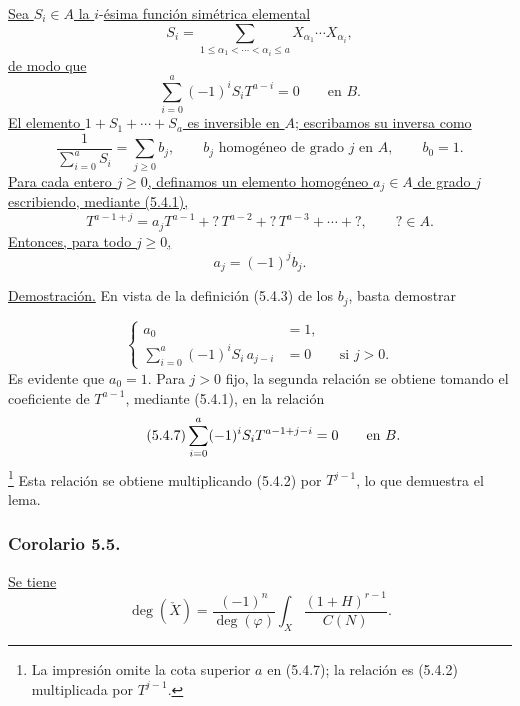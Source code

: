 \pageoriginale

\underline{Sea $S_i\in A$ la }$i$-\underline{ésima función simétrica elemental}
\[
S_i=\sum_{1\leq\alpha_1<\cdots<\alpha_i\leq a}
X_{\alpha_1}\cdots X_{\alpha_i},
\]
\underline{de modo que}
\begin{equation}\tag{5.4.2}
\sum_{i=0}^{a}(-1)^iS_iT^{a-i}=0
\qquad\text{en }B.
\end{equation}
\underline{El elemento $1+S_1+\cdots+S_a$ es inversible en $A$;
escribamos su inversa como}
\begin{equation}\tag{5.4.3}
\frac{1}{\sum_{i=0}^{a}S_i}
=\sum_{j\geq0}b_j,
\qquad b_j\text{ homogéneo de grado }j\text{ en }A,
\qquad b_0=1.
\end{equation}
\underline{Para cada entero $j\geq0$, definamos un elemento homogéneo
$a_j\in A$ de grado $j$ escribiendo, mediante (5.4.1),}
\begin{equation}\tag{5.4.4}
T^{a-1+j}
=a_jT^{a-1}+{}?\,T^{a-2}+{}?\,T^{a-3}+\cdots+{}?,
\qquad ?\in A.
\end{equation}
\underline{Entonces, para todo $j\geq0$,}
\begin{equation}\tag{5.4.5}
a_j=(-1)^jb_j.
\end{equation}

\noindent\underline{Demostración.}
En vista de la definición (5.4.3) de los $b_j$, basta demostrar

\pageoriginale

\begin{equation}\tag{5.4.6}
\left\{
\begin{aligned}
a_0&=1,\\
\sum_{i=0}^{a}(-1)^iS_i\,a_{j-i}&=0
&&\text{si }j>0.
\end{aligned}
\right.
\end{equation}
Es evidente que $a_0=1$. Para $j>0$ fijo, la segunda relación se
obtiene tomando el coeficiente de $T^{a-1}$, mediante (5.4.1), en la
relación
\begin{equation}\tag{5.4.7}
\sisi{\displaystyle\sum_{i=0}}{\displaystyle\sum_{i=0}^{a}}
(-1)^iS_iT^{a-1+j-i}=0
\qquad\text{en }B.
\end{equation}
\footnote{La impresión omite la cota superior $a$ en (5.4.7); la
relación es (5.4.2) multiplicada por $T^{j-1}$.}
Esta relación se obtiene multiplicando (5.4.2) por $T^{j-1}$, lo que
demuestra el lema.

\subsubsection*{Corolario 5.5.}
\underline{Se tiene}
\begin{equation}\tag{5.5.1}
\deg(\check X)
=\frac{(-1)^n}{\deg(\varphi)}
\int_X\frac{(1+H)^{r-1}}{C(N)}.
\end{equation}

